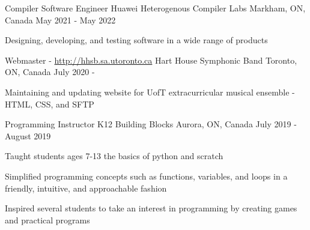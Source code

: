 

\begin{cventries}

  \cventry
  {Compiler Software Engineer}
  {Huawei Heterogenous Compiler Labs}
  {Markham, ON, Canada}
  {May 2021 - May 2022}
  {
    \begin{cvitems}
      \item {Designing, developing, and testing software in a wide range of products }
    \end{cvitems}
  }

  \cventry
  {Webmaster - \url{http://hhsb.sa.utoronto.ca}} %
  {Hart House Symphonic Band} %
  {Toronto, ON, Canada} %
  {July 2020 - } %
  {
    \begin{cvitems} %
      \item {Maintaining and updating website for UofT extracurricular musical ensemble - HTML, CSS, and SFTP}
    \end{cvitems}
  }

  \cventry
  {Programming Instructor} %
  {K12 Building Blocks} %
  {Aurora, ON, Canada} %
  {July 2019 - August 2019} %
  {
    \begin{cvitems} %
      \item {Taught students ages 7-13 the basics of python and scratch}
      \item { Simplified programming concepts such as functions, variables, and loops in a friendly, intuitive, and approachable fashion}
      \item {Inspired several students to take an interest in programming by creating games and practical programs}
    \end{cvitems}
  }

\end{cventries}